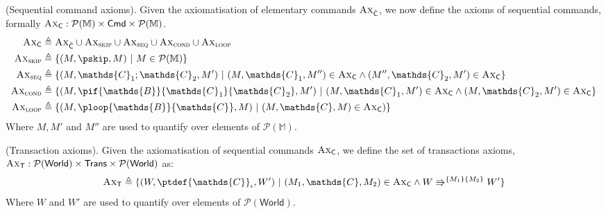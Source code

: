 \param (Sequential command axioms). Given the axiomatisation of elementary commands $\textsc{Ax}_{\hat{\mathsf{C}}}$, we now define the axioms of sequential commands, formally $\textsc{Ax}_\mathsf{C} : \mathcal{P}(\mathbb{M}) \times \mathsf{Cmd} \times \mathcal{P}(\mathbb{M})$.
\begin{align*}
	\textsc{Ax}_\mathsf{C} &\triangleq \textsc{Ax}_{\hat{\mathsf{C}}} \cup \textsc{Ax}_{\textsc{skip}} \cup \textsc{Ax}_{\textsc{seq}} \cup \textsc{Ax}_{\textsc{cond}} \cup \textsc{Ax}_{\textsc{loop}}
	\\
	\textsc{Ax}_{\textsc{skip}} &\triangleq \{ (M, \pskip, M)\ |\ M \in \mathcal{P}(\mathbb{M}) \}
	\\
	\textsc{Ax}_{\textsc{seq}} &\triangleq \{ (M, \mathds{C}_1 ; \mathds{C}_2, M')\ |\ (M, \mathds{C}_1, M'') \in \textsc{Ax}_\mathsf{C} \land (M'', \mathds{C}_2, M') \in \textsc{Ax}_\mathsf{C} \}
	\\
	\textsc{Ax}_{\textsc{cond}} &\triangleq \{ (M, \pif{\mathds{B}}{\mathds{C}_1}{\mathds{C}_2}, M')\ |\ (M, \mathds{C}_1, M') \in \textsc{Ax}_\mathsf{C} \land (M, \mathds{C}_2, M') \in \textsc{Ax}_\mathsf{C} \}
	\\
	\textsc{Ax}_{\textsc{loop}} &\triangleq \{ (M, \ploop{\mathds{B}}{\mathds{C}}, M)\ |\ (M, \mathds{C}, M) \in \textsc{Ax}_\mathsf{C}) \}
\end{align*}
Where $M, M'$ and $M''$ are used to quantify over elements of $\mathcal{P}(\mathbb{M})$.

\param (Transaction axioms). Given the axiomatisation of sequential commands $\textsc{Ax}_\mathsf{C}$, we define the set of transactions axioms, $\textsc{Ax}_\mathsf{T} : \mathcal{P}(\mathsf{World}) \times \mathsf{Trans} \times \mathcal{P}(\mathsf{World})$ as:
\[
	\textsc{Ax}_\mathsf{T} \triangleq \{ (W, \ptdef{\mathds{C}}_\iota, W')\ |\ (M_1, \mathds{C}, M_2) \in \textsc{Ax}_\mathsf{C} \land W \Rrightarrow^{\{M_1\}\{M_2\}} W' \}
\]
Where $W$ and $W'$ are used to quantify over elements of $\mathcal{P}(\mathsf{World})$.

